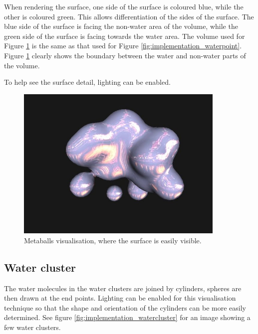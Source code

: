 When rendering the surface, one side of the surface is coloured blue, while the
other is coloured green. This allows differentiation of the sides of the
surface. The blue side of the surface is facing the non-water area of the
volume, while the green side of the surface is facing towards the water area.
The volume used for Figure \ref{fig:implementation_metaballs} is the same as
that used for Figure \ref{fig:implementation_waterpoint}. Figure
\ref{fig:implementation_metaballs} clearly shows the boundary between the water
and non-water parts of the volume.

To help see the surface detail, lighting can be enabled.

\begin{figure}[h!]
  \begin{center}
    \includegraphics[width=100mm]{metaballs}
  \end{center}
  \caption{Metaballs visualisation, where the surface is easily visible.}
  \label{fig:implementation_metaballs}
\end{figure}


\subsection{Water cluster}
\label{sub:implementation_cluster}

The water molecules in the water clusters are joined by cylinders, spheres are
then drawn at the end points. Lighting can be enabled for this visualisation
technique so that the shape and orientation of the cylinders can be more easily
determined. See figure \ref{fig:implementation_watercluster} for an image
showing a few water clusters.

